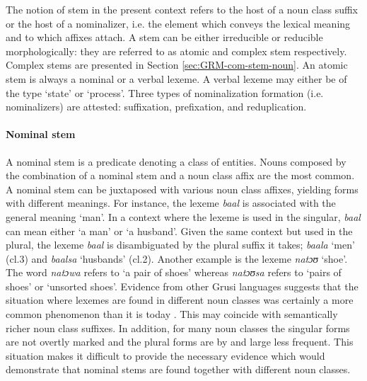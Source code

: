 \begin{exe}
\begin{exe}
\begin{exe}
{\begin{exe}
\begin{exe}
\begin{exe}
\begin{exe}
The notion of stem in the present context refers to the host of a noun class
suffix or the  host of a nominalizer, i.e. the element which conveys the lexical
meaning and  to which affixes attach. A stem can be either irreducible or
reducible morphologically: they are referred to as atomic  and complex stem
respectively.  Complex stems are presented in  Section
\ref{sec:GRM-com-stem-noun}.   An atomic stem is always a  nominal or a verbal
lexeme.  A verbal lexeme may either be of the type `state' or `process'. Three
types of nominalization formation (i.e. nominalizers) are attested: suffixation,
prefixation, and reduplication.  


\paragraph{Nominal  stem}
\label{sec:GRM-nom-stem}
A nominal stem is a predicate denoting a class of entities.   Nouns composed by
the combination of  a nominal stem and a noun class affix are the most common. A
nominal stem can be juxtaposed with various noun class affixes, yielding forms
with
different meanings. For instance, the lexeme {\it baal} is associated with the
general meaning `man'. In a context where the lexeme is used in the singular,
{\it baal} can mean either `a man' or `a husband'. Given the same context but
used in the plural, the lexeme {\it baal} is disambiguated by the 
plural suffix it takes;  {\it baala} `men'  ({\sc cl.3}) and  {\it baalsa}
`husbands'  ({\sc cl.2}). Another
example is the lexeme {\it natɔʊ} `shoe'. The word {\it natɔwa} refers to `a 
pair
of shoes' whereas {\it natɔʊsa} refers to `pairs of shoes' or `unsorted shoes'.
Evidence from other Grusi languages suggests that the situation where    lexemes
are found in different noun classes was certainly a   more common
phenomenon than it is today \cite[126--128]{Bonv88}. This may coincide
with semantically richer
noun class suffixes. In addition, for many noun classes the singular forms are
not overtly marked and the plural forms are by and large less frequent. This
situation makes it difficult to provide the necessary evidence which would
demonstrate that nominal stems are found together with different noun classes.  


\end{exe}
\end{exe}
\end{exe}
\end{exe}}
\end{exe}
\end{exe}
\end{exe}
